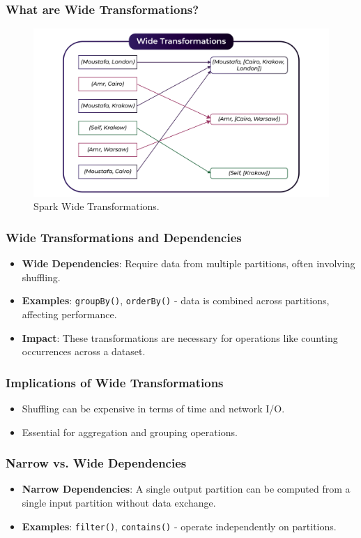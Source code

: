 \begin{frame}
    \frametitle{What are Wide Transformations?}
    \begin{figure}
        \includegraphics[width=\textwidth,height=.75\textheight,keepaspectratio]{./Figures/chapter-04/Wide}
        \caption{Spark Wide Transformations.}\label{fig:spark_wide}
    \end{figure}
\end{frame}

\begin{frame}
    \frametitle{Wide Transformations and Dependencies}
    \begin{itemize}
        \item \textbf{Wide Dependencies}: Require data from multiple partitions, often involving shuffling.
        \item \textbf{Examples}: \texttt{groupBy()}, \texttt{orderBy()} - data is combined across partitions, affecting performance.
        \item \textbf{Impact}: These transformations are necessary for operations like counting occurrences across a dataset.
    \end{itemize}
\end{frame}

\begin{frame}
    \frametitle{Implications of Wide Transformations}
    \begin{itemize}
        \item Shuffling can be expensive in terms of time and network I/O.
        \item Essential for aggregation and grouping operations.
    \end{itemize}
\end{frame}

\begin{frame}
    \frametitle{Narrow vs. Wide Dependencies}
    \begin{itemize}
        \item \textbf{Narrow Dependencies}: A single output partition can be computed from a single input partition without data exchange.
        \item \textbf{Examples}: \texttt{filter()}, \texttt{contains()} - operate independently on partitions.
    \end{itemize}
\end{frame}

